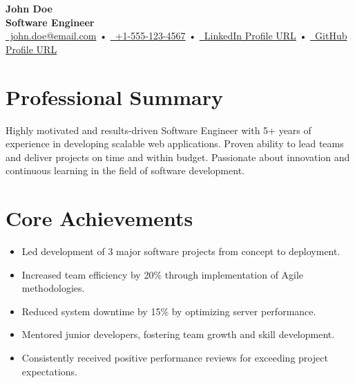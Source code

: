 \documentclass[a4paper,10pt]{article}
\begin{document}
\begin{center}
    {\Huge \textbf{John Doe}} \\
    \vspace{6pt}
    \textbf{Software Engineer} \\
    \vspace{3pt}
    \href{mailto:john.doe@email.com}{\faEnvelope\, john.doe@email.com} •
    \href{tel:+15551234567}{\faPhone\, +1-555-123-4567} •
    \href{https://linkedin.com/in/johndoe-linkedin}{\faLinkedin\, LinkedIn Profile URL} •
    \href{https://github.com/johndoe-github}{\faGithub\, GitHub Profile URL}
\end{center}

\section*{Professional Summary}
Highly motivated and results-driven Software Engineer with 5+ years of experience in developing scalable web applications. Proven ability to lead teams and deliver projects on time and within budget.  Passionate about innovation and continuous learning in the field of software development.

\section*{Core Achievements}
\begin{itemize}
    \item Led development of 3 major software projects from concept to deployment.
    \item Increased team efficiency by 20\% through implementation of Agile methodologies.
    \item Reduced system downtime by 15\% by optimizing server performance.
    \item Mentored junior developers, fostering team growth and skill development.
    \item Consistently received positive performance reviews for exceeding project expectations.
\end{itemize}
\end{document}
